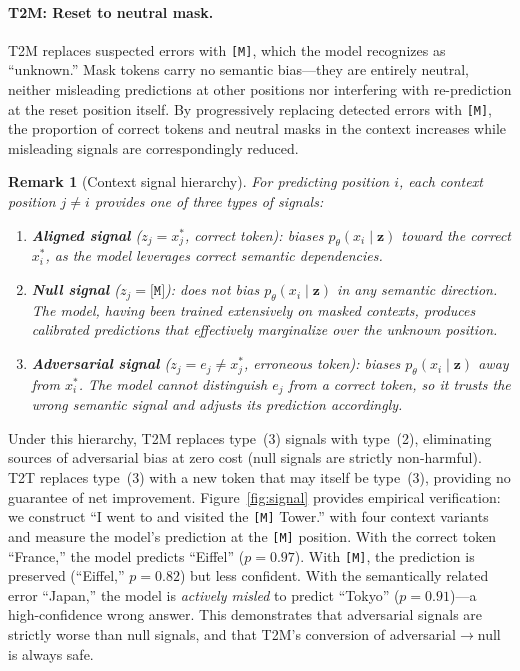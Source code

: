 \documentclass{article}
\newtheorem{remark}{Remark}
\newcommand{\mask}{\texttt{[M]}}
\newcommand{\TtoT}{\textrm{T2T}}
\newcommand{\TtoM}{\textrm{T2M}}
\begin{document}
\paragraph{T2M: Reset to neutral mask.} \TtoM{} replaces suspected errors with \mask{}, which the model recognizes as ``unknown.'' Mask tokens carry no semantic bias---they are entirely neutral, neither misleading predictions at other positions nor interfering with re-prediction at the reset position itself. By progressively replacing detected errors with \mask{}, the proportion of correct tokens and neutral masks in the context increases while misleading signals are correspondingly reduced.

\begin{remark}[Context signal hierarchy]
\label{rem:signal}
For predicting position $i$, each context position $j \neq i$ provides one of three types of signals:
\begin{enumerate}
    \item \textbf{Aligned signal} ($z_j = x_j^{*}$, correct token): biases $p_\theta(x_i \mid \mathbf{z})$ toward the correct $x_i^{*}$, as the model leverages correct semantic dependencies.
    \item \textbf{Null signal} ($z_j = \mask{}$): does not bias $p_\theta(x_i \mid \mathbf{z})$ in any semantic direction. The model, having been trained extensively on masked contexts, produces calibrated predictions that effectively marginalize over the unknown position.
    \item \textbf{Adversarial signal} ($z_j = e_j \neq x_j^{*}$, erroneous token): biases $p_\theta(x_i \mid \mathbf{z})$ \emph{away} from $x_i^{*}$. The model cannot distinguish $e_j$ from a correct token, so it trusts the wrong semantic signal and adjusts its prediction accordingly.
\end{enumerate}
\end{remark}

Under this hierarchy, \TtoM{} replaces type~(3) signals with type~(2), eliminating sources of adversarial bias at zero cost (null signals are strictly non-harmful). \TtoT{} replaces type~(3) with a new token that may itself be type~(3), providing no guarantee of net improvement. Figure~\ref{fig:signal} provides empirical verification: we construct ``I went to \underline{\hspace{1cm}} and visited the \mask{} Tower.'' with four context variants and measure the model's prediction at the \mask{} position. With the correct token ``France,'' the model predicts ``Eiffel'' ($p{=}0.97$). With \mask{}, the prediction is preserved (``Eiffel,'' $p{=}0.82$) but less confident. With the semantically related error ``Japan,'' the model is \emph{actively misled} to predict ``Tokyo'' ($p{=}0.91$)---a high-confidence wrong answer. This demonstrates that adversarial signals are strictly worse than null signals, and that \TtoM{}'s conversion of adversarial$\to$null is always safe.
\end{document}
